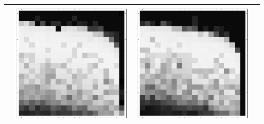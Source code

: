 \documentclass[10pt]{article}
\begin{document}
\begin{tabular}{|c|c|c|c|}
        & \includegraphics[scale=0.25]{plots/simple/LF-40R10R-20T10-MNIST-6.png}
        & \includegraphics[scale=0.25]{plots/simple/LF-40R20R10R-20T10-MNIST-6.png} \\ \hline

\end{tabular}
\end{document}
